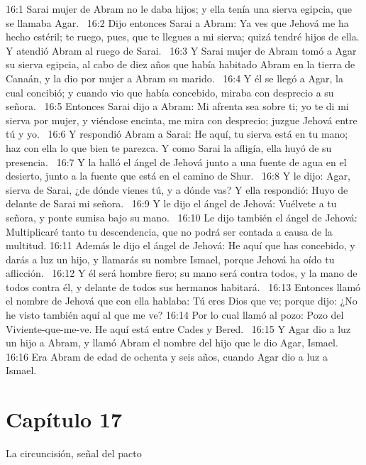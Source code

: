 16:1 Sarai mujer de Abram no le daba hijos; y ella tenía una sierva egipcia, que se llamaba Agar.  
16:2 Dijo entonces Sarai a Abram: Ya ves que Jehová me ha hecho estéril; te ruego, pues, que te llegues a mi sierva; quizá tendré hijos de ella. Y atendió Abram al ruego de Sarai.  
16:3 Y Sarai mujer de Abram tomó a Agar su sierva egipcia, al cabo de diez años que había habitado Abram en la tierra de Canaán, y la dio por mujer a Abram su marido.  
16:4 Y él se llegó a Agar, la cual concibió; y cuando vio que había concebido, miraba con desprecio a su señora.  
16:5 Entonces Sarai dijo a Abram: Mi afrenta sea sobre ti; yo te di mi sierva por mujer, y viéndose encinta, me mira con desprecio; juzgue Jehová entre tú y yo.  
16:6 Y respondió Abram a Sarai: He aquí, tu sierva está en tu mano; haz con ella lo que bien te parezca. Y como Sarai la afligía, ella huyó de su presencia.  
16:7 Y la halló el ángel de Jehová junto a una fuente de agua en el desierto, junto a la fuente que está en el camino de Shur.  
16:8 Y le dijo: Agar, sierva de Sarai, ¿de dónde vienes tú, y a dónde vas? Y ella respondió: Huyo de delante de Sarai mi señora.  
16:9 Y le dijo el ángel de Jehová: Vuélvete a tu señora, y ponte sumisa bajo su mano.  
16:10 Le dijo también el ángel de Jehová: Multiplicaré tanto tu descendencia, que no podrá ser contada a causa de la multitud. 
16:11 Además le dijo el ángel de Jehová: He aquí que has concebido, y darás a luz un hijo, y llamarás su nombre Ismael, porque Jehová ha oído tu aflicción.  
16:12 Y él será hombre fiero; su mano será contra todos, y la mano de todos contra él, y delante de todos sus hermanos habitará.  
16:13 Entonces llamó el nombre de Jehová que con ella hablaba: Tú eres Dios que ve; porque dijo: ¿No he visto también aquí al que me ve? 
16:14 Por lo cual llamó al pozo: Pozo del Viviente-que-me-ve. He aquí está entre Cades y Bered.  
16:15 Y Agar dio a luz un hijo a Abram, y llamó Abram el nombre del hijo que le dio Agar, Ismael.  
16:16 Era Abram de edad de ochenta y seis años, cuando Agar dio a luz a Ismael.  
\section*{Capítulo 17 }
La circuncisión, señal del pacto  

